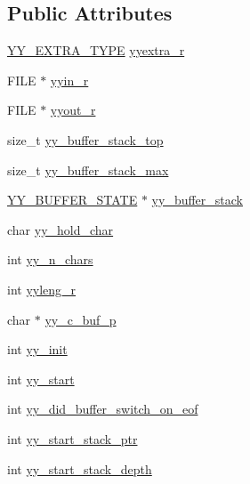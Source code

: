 \subsection*{Public Attributes}
\begin{DoxyCompactItemize}
\item 
\hyperlink{scanner_8h_a26938d921de835f6183c02e54cf08828}{Y\-Y\-\_\-\-E\-X\-T\-R\-A\-\_\-\-T\-Y\-P\-E} \hyperlink{structyyguts__t_aef05c0d6725a5214f6b30466f0b01c47}{yyextra\-\_\-r}
\item 
F\-I\-L\-E $\ast$ \hyperlink{structyyguts__t_a21f81ca100b12364a5095a37d1c6f650}{yyin\-\_\-r}
\item 
F\-I\-L\-E $\ast$ \hyperlink{structyyguts__t_a436368a905aaf12e809e265749c74031}{yyout\-\_\-r}
\item 
size\-\_\-t \hyperlink{structyyguts__t_af92507d904af2fcd4509acde654a9850}{yy\-\_\-buffer\-\_\-stack\-\_\-top}
\item 
size\-\_\-t \hyperlink{structyyguts__t_a4435bb91e87f9988b096afc21386289a}{yy\-\_\-buffer\-\_\-stack\-\_\-max}
\item 
\hyperlink{scanner_8c_a4e5bd2d129903df83f3d13effaf8f3e4}{Y\-Y\-\_\-\-B\-U\-F\-F\-E\-R\-\_\-\-S\-T\-A\-T\-E} $\ast$ \hyperlink{structyyguts__t_ad0b9d576189d518a4482f20ed9b2a416}{yy\-\_\-buffer\-\_\-stack}
\item 
char \hyperlink{structyyguts__t_adde3f71374c223bbac47284824996e86}{yy\-\_\-hold\-\_\-char}
\item 
int \hyperlink{structyyguts__t_a99c9218941829a6662d358422fd4184a}{yy\-\_\-n\-\_\-chars}
\item 
int \hyperlink{structyyguts__t_aba739bc731f0e9cbb0b6bdfca7930ebd}{yyleng\-\_\-r}
\item 
char $\ast$ \hyperlink{structyyguts__t_ab1b9bcacb33aab1e02b625512bc0e221}{yy\-\_\-c\-\_\-buf\-\_\-p}
\item 
int \hyperlink{structyyguts__t_abbef56b2d8359f6a15629c104f5dd030}{yy\-\_\-init}
\item 
int \hyperlink{structyyguts__t_a8baf7d47fe53035d9bc2a9670795ff01}{yy\-\_\-start}
\item 
int \hyperlink{structyyguts__t_a2daec411627700709ef2fd927e69627d}{yy\-\_\-did\-\_\-buffer\-\_\-switch\-\_\-on\-\_\-eof}
\item 
int \hyperlink{structyyguts__t_ad9e132dacc2904a8ae76c64c72e33795}{yy\-\_\-start\-\_\-stack\-\_\-ptr}
\item 
int \hyperlink{structyyguts__t_a35bedf1c17debd766565b99c39132eb4}{yy\-\_\-start\-\_\-stack\-\_\-depth}

\end{DoxyCompactItemize}

